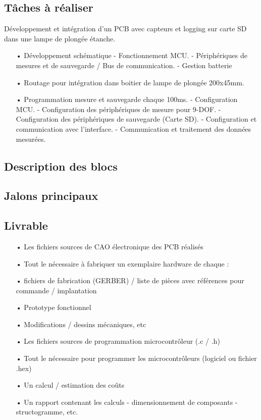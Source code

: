 \clearpage

\subsection{Tâches à réaliser}
Développement et intégration d’un PCB avec capteurs et logging sur carte SD dans une lampe de plongée étanche.
\begin{itemize}
	\item[•] Développement schématique 
	\subitem- Fonctionnement MCU.
	\subitem-	Périphériques de mesures et de sauvegarde / Bus de communication.
	\subitem-	Gestion batterie 
	\item[•]	Routage pour intégration dans boitier de lampe de plongée 200x45mm.
	\item[•]	Programmation mesure et sauvegarde chaque 100ms.
	\subitem-	Configuration MCU.
	\subitem-	Configuration des périphériques de mesure pour 9-DOF.
	\subitem-	Configuration des périphériques de sauvegarde (Carte SD).
	\subitem-	Configuration et communication avec l'interface.
	\subitem-	Communication et traitement des données mesurées.
\end{itemize}




\subsection{Description des blocs}

\clearpage

\subsection{Jalons principaux}


\subsection{Livrable}
\begin{itemize}
	\item[•] Les fichiers sources de CAO électronique des PCB réalisés
	\item[•] Tout le nécessaire à fabriquer un exemplaire hardware de chaque :
	\item[•] fichiers de fabrication (GERBER) / liste de pièces avec références pour commande / implantation
	\item[•] Prototype fonctionnel
	\item[•] Modifications / dessins mécaniques, etc
	\item[•] Les fichiers sources de programmation microcontrôleur (.c  / .h)
	\item[•] Tout le nécessaire pour programmer les microcontrôleurs (logiciel ou fichier .hex)
	\item[•] Un calcul / estimation des coûts
	\item[•] Un rapport contenant les calculs - dimensionnement de composants - structogramme, etc.
\end{itemize}

\clearpage
